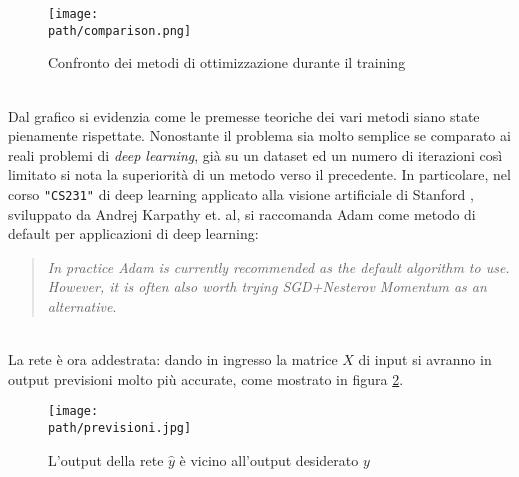 \begin{figure}[h!]
 \centering
 \texttt{[image: \\path/comparison.png]}
 \caption{Confronto dei metodi di ottimizzazione durante il training}
 \label{fig:comparison}
\end{figure}
\\
Dal grafico si evidenzia come le premesse teoriche dei vari metodi siano state pienamente rispettate. Nonostante il problema sia molto semplice se comparato ai reali problemi di \emph{deep learning}, già su un dataset ed un numero di iterazioni così limitato si nota la superiorità di un metodo verso il precedente. In particolare, nel corso \texttt{"CS231"} di deep learning applicato alla visione artificiale di Stanford \parencite{WCS231adam}, sviluppato da Andrej Karpathy et. al, si raccomanda Adam come metodo di default per applicazioni di deep learning: 
\begin{quote}
\emph{In practice Adam is currently recommended as the default algorithm to use. However, it is often also worth trying SGD+Nesterov Momentum as an alternative}.
\end{quote}
\\
La rete è ora addestrata: dando in ingresso la matrice $X$ di input si avranno in output previsioni molto più accurate, come mostrato in figura \ref{fig:previsioni}. 
\begin{figure}[h!]
 \centering
 \texttt{[image: \\path/previsioni.jpg]}
 \caption{L'output della rete $\hat{y}$ è vicino all'output desiderato $y$}
 \label{fig:previsioni}
\end{figure}

